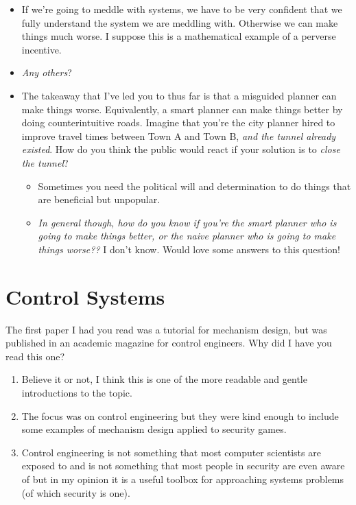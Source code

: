 \documentclass[11pt]{article}
\begin{document}
\begin{itemize}
    \item If we're going to meddle with systems, we have to be very confident that we fully understand the system we are meddling with. Otherwise we can make things much worse. I suppose this is a mathematical example of a perverse incentive. 
    \item {\it Any others}?
    \item The takeaway that I've led you to thus far is that a misguided planner can make things worse. Equivalently, a smart planner can make things better by doing counterintuitive roads. Imagine that you're the city planner hired to improve travel times between Town A and Town B, {\it and the tunnel already existed}. How do you think the public would react if your solution is to {\it close the tunnel}?
    \begin{itemize}
        \item Sometimes you need the political will and determination to do things that are beneficial but unpopular.
        \item {\it In general though, how do you know if you're the smart planner who is going to make things better, or the naive planner who is going to make things worse??} I don't know. Would love some answers to this question! 
    \end{itemize}
\end{itemize}

\section{Control Systems}

The first paper I had you read was a tutorial for mechanism design, but was published in an academic magazine for control engineers. Why did I have you read this one?
\begin{enumerate}
    \item Believe it or not, I think this is one of the more readable and gentle introductions to the topic.
    \item The focus was on control engineering but they were kind enough to include some examples of mechanism design applied to security games.
    \item Control engineering is not something that most computer scientists are exposed to and is not something that most people in security are even aware of but in my opinion it is a useful toolbox for approaching systems problems (of which security is one).
\end{enumerate}
\end{document}
